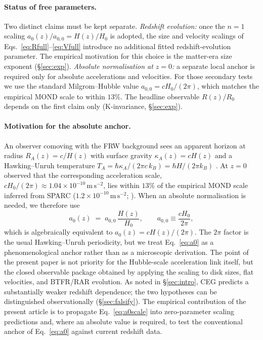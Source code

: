 \documentclass[twocolumn,letterpaper]{aastex631}
\newcommand{\azero}{a_0}
\newcommand{\azerolocal}{a_{0,0}}
\begin{document}
\paragraph{Status of free parameters.}
Two distinct claims must be kept separate.
\emph{Redshift evolution:} once the
$n=1$ scaling $\azero(z)/\azerolocal=H(z)/H_0$ is adopted, the
size and velocity scalings of Eqs.~\ref{eq:Rfull}--\ref{eq:Vfull}
introduce no additional fitted redshift-evolution parameter.
The empirical motivation for this choice is the matter-era size
exponent (\S\ref{sec:exp}).
\emph{Absolute normalisation at $z\!=\!0$:} a separate local
anchor is required only for absolute accelerations and velocities.
For those secondary tests we use the standard Milgrom--Hubble
value $\azerolocal=cH_0/(2\pi)$, which matches the empirical MOND
scale to within $13\%$.  The headline observable $R(z)/R_{0}$
depends on the first claim only (K-invariance, \S\ref{sec:exp}).

\paragraph{Motivation for the absolute anchor.}
An observer comoving with the FRW background sees an apparent
horizon at radius $R_A(z)=c/H(z)$ with surface gravity
$\kappa_A(z)=cH(z)$ \citep{BakRey2000,CaiKim2005} and a
Hawking--Unruh temperature
$T_A=\hbar\kappa_A/(2\pi c\,k_B)=\hbar H/(2\pi k_B)$
\citep{Hawking1975,Unruh1976,GibbonsHawking1977}.  At $z=0$
\citet{Milgrom1999} observed that the corresponding acceleration
scale, $cH_0/(2\pi)\!\approx\!1.04\times10^{-10}
\,\mathrm{m\,s^{-2}}$, lies within $13\%$ of the empirical MOND
scale inferred from SPARC
($1.2\times10^{-10}\,\mathrm{m\,s^{-2}}$;
\citealt{Lelli2016,Li2018}).  When an absolute normalisation is
needed, we therefore use
\begin{equation}\label{eq:a0}
  \azero(z)\;=\;\azerolocal\,\frac{H(z)}{H_0},
  \qquad
  \azerolocal\equiv\frac{cH_0}{2\pi},
\end{equation}
which is algebraically equivalent to $\azero(z)=cH(z)/(2\pi)$.
The $2\pi$ factor is the usual Hawking--Unruh periodicity, but
we treat Eq.~\ref{eq:a0} as a phenomenological anchor rather than
as a microscopic derivation.  The point of the present paper is
not priority for the Hubble-scale acceleration link itself, but
the closed observable package obtained by applying the scaling to
disk sizes, flat velocities, and BTFR/RAR evolution.  As noted in \S\ref{sec:intro}, CEG
\citep{Hossenfelder2017,HossenfelderMistele2018} predicts a
substantially weaker redshift dependence; the two hypotheses
can be distinguished observationally (\S\ref{sec:falsify}).  The
empirical contribution of the present article is to propagate
Eq.~\ref{eq:a0scale} into zero-parameter scaling predictions and,
where an absolute value is required, to test the conventional
anchor of Eq.~\ref{eq:a0} against current redshift data.
\end{document}
